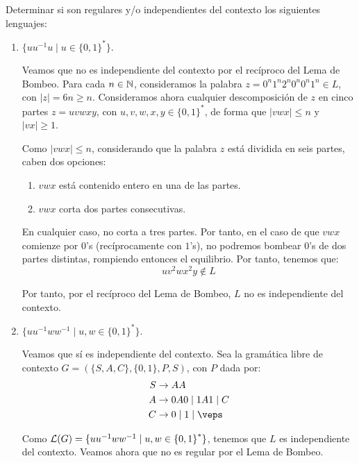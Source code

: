 \begin{ejercicio}\label{ej:1.6.9}
    Determinar si son regulares y/o independientes del contexto los siguientes lenguajes:
    \begin{enumerate}
        \item \label{ej:1.6.9-1}
        $\{uu^{-1}u \mid u\in {\{0,1\}}^{\ast}\}$.
        
        Veamos que no es independiente del contexto por el recíproco del Lema de Bombeo. Para cada $n\in \mathbb{N}$, consideramos la palabra $z=0^n1^{n}2^n0^{n}0^n1^n\in L$, con $|z|=6n\geq n$. Consideramos ahora cualquier descomposición de $z$ en cinco partes $z=uvwxy$, con $u,v,w,x,y\in {\{0,1\}}^{\ast}$, de forma que $|vwx|\leq n$ y $|vx|\geq 1$.

        Como $|vwx|\leq n$, considerando que la palabra $z$ está dividida en seis partes, caben dos opciones:
        \begin{enumerate}
            \item $vwx$ está contenido entero en una de las partes.
            \item $vwx$ corta dos partes consecutivas.
        \end{enumerate}

        En cualquier caso, no corta a tres partes. Por tanto, en el caso de que $vwx$ comienze por $0$'s (recíprocamente con $1$'s), no podremos bombear $0$'s de dos partes distintas, rompiendo entonces el equilibrio. Por tanto, tenemos que:
        \begin{equation*}
            uv^2wx^2y\notin L
        \end{equation*}

        Por tanto, por el recíproco del Lema de Bombeo, $L$ no es independiente del contexto.
        \item $\{uu^{-1}ww^{-1}\mid u,w\in {\{0,1\}}^{\ast}\}$.
        
        Veamos que sí es independiente del contexto. Sea la gramática libre de contexto $G=(\{S,A,C\},\{0,1\},P,S)$, con $P$ dada por:
        \begin{align*}
            S &\rightarrow AA \\
            A &\rightarrow 0A0 \mid 1A1 \mid C \\
            C &\rightarrow 0 \mid 1\mid \veps
        \end{align*}

        Como $\mathcal{L}(G)=\{uu^{-1}ww^{-1}\mid u,w\in {\{0,1\}}^{\ast}\}$, tenemos que $L$ es independiente del contexto. Veamos ahora que no es regular por el Lema de Bombeo.


\end{enumerate}
\end{ejercicio}
